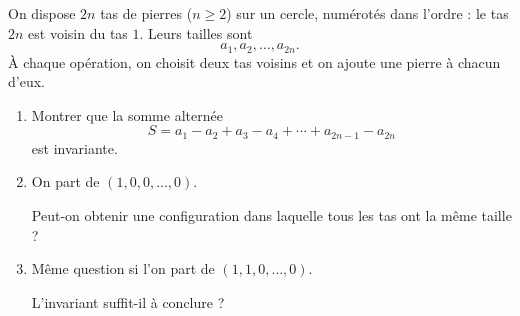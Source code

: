 On dispose $2n$ tas de pierres ($n \geq 2$) sur un cercle, numérotés dans
l'ordre : le tas $2n$ est voisin du tas $1$. Leurs tailles sont
\[
a_1, a_2, \ldots, a_{2n}.
\]
À chaque opération, on choisit deux tas voisins et on ajoute une pierre à
chacun d'eux.
\begin{enumerate}
  \item Montrer que la somme alternée
  \[
  S = a_1 - a_2 + a_3 - a_4 + \cdots + a_{2n-1} - a_{2n}
  \]
  est invariante.
  \item On part de $(1, 0, 0, \ldots, 0)$.

  Peut-on obtenir une configuration dans laquelle tous les tas ont la même
  taille ?
  \item Même question si l'on part de $(1, 1, 0, \ldots, 0)$.

  L'invariant suffit-il à conclure ?
\end{enumerate}
